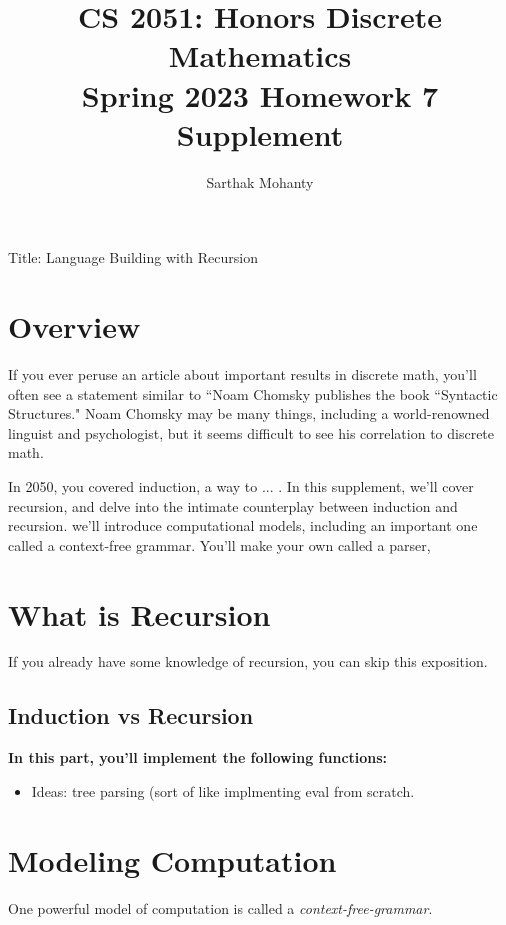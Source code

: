 \documentclass{article}
\title{\vspace{-1cm}CS 2051: Honors Discrete Mathematics \\Spring 2023 Homework 7 Supplement}
\author{Sarthak Mohanty }
\date{}
\begin{document}
\maketitle


Title: Language Building with Recursion

\section*{Overview}

If you ever peruse an article about important results in discrete math, you'll often see a statement similar to ``Noam Chomsky publishes the book “Syntactic Structures."  Noam Chomsky may be many things, including a world-renowned linguist and psychologist, but it seems difficult to see his correlation to discrete math.

In 2050, you covered induction, a way to ... . In this supplement, we'll cover recursion, and delve into the intimate counterplay between induction and recursion. we'll introduce computational models, including an important one called a context-free grammar. You'll make your own called a parser,

\section*{What is Recursion}

If you already have some knowledge of recursion, you can skip this exposition.
\subsection*{Induction vs Recursion}


\begin{tcolorbox}[enhanced,interior style={top color=Dandelion!20,bottom color=Dandelion!30}]
    \textbf{In this part, you'll implement the following functions:}
    \begin{itemize}
        \item Ideas: tree parsing (sort of like implmenting eval from scratch.
    \end{itemize}
\end{tcolorbox}


\section*{Modeling Computation}
    One powerful model of computation is called a \textit{context-free-grammar}. 
\end{document}
